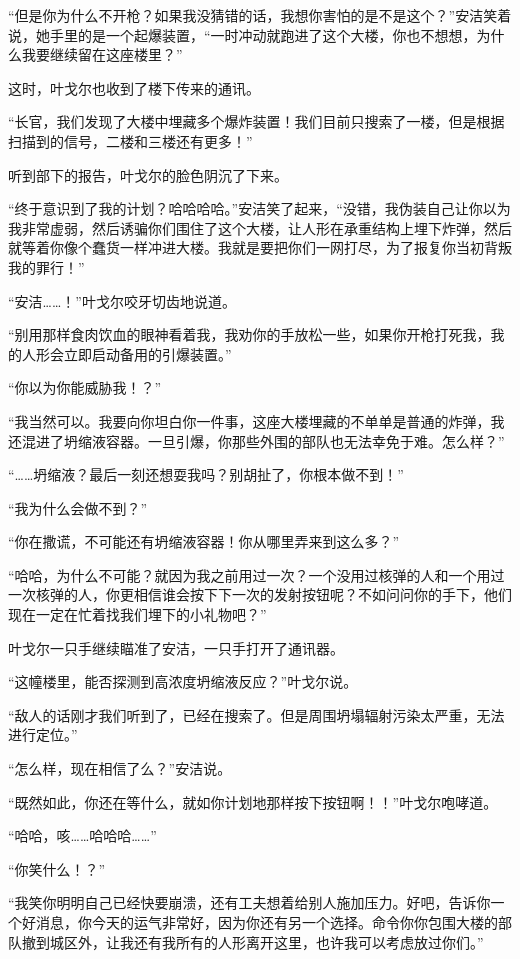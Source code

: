 “但是你为什么不开枪？如果我没猜错的话，我想你害怕的是不是这个？”安洁笑着说，她手里的是一个起爆装置，“一时冲动就跑进了这个大楼，你也不想想，为什么我要继续留在这座楼里？”

这时，叶戈尔也收到了楼下传来的通讯。

“长官，我们发现了大楼中埋藏多个爆炸装置！我们目前只搜索了一楼，但是根据扫描到的信号，二楼和三楼还有更多！”

听到部下的报告，叶戈尔的脸色阴沉了下来。

“终于意识到了我的计划？哈哈哈哈。”安洁笑了起来，“没错，我伪装自己让你以为我非常虚弱，然后诱骗你们围住了这个大楼，让人形在承重结构上埋下炸弹，然后就等着你像个蠢货一样冲进大楼。我就是要把你们一网打尽，为了报复你当初背叛我的罪行！”

“安洁……！”叶戈尔咬牙切齿地说道。

“别用那样食肉饮血的眼神看着我，我劝你的手放松一些，如果你开枪打死我，我的人形会立即启动备用的引爆装置。”

“你以为你能威胁我！？”

“我当然可以。我要向你坦白你一件事，这座大楼埋藏的不单单是普通的炸弹，我还混进了坍缩液容器。一旦引爆，你那些外围的部队也无法幸免于难。怎么样？”

“……坍缩液？最后一刻还想耍我吗？别胡扯了，你根本做不到！”

“我为什么会做不到？”

“你在撒谎，不可能还有坍缩液容器！你从哪里弄来到这么多？”

“哈哈，为什么不可能？就因为我之前用过一次？一个没用过核弹的人和一个用过一次核弹的人，你更相信谁会按下下一次的发射按钮呢？不如问问你的手下，他们现在一定在忙着找我们埋下的小礼物吧？”

叶戈尔一只手继续瞄准了安洁，一只手打开了通讯器。

“这幢楼里，能否探测到高浓度坍缩液反应？”叶戈尔说。

“敌人的话刚才我们听到了，已经在搜索了。但是周围坍塌辐射污染太严重，无法进行定位。”

“怎么样，现在相信了么？”安洁说。

“既然如此，你还在等什么，就如你计划地那样按下按钮啊！！”叶戈尔咆哮道。

“哈哈，咳……哈哈哈……”

“你笑什么！？”

“我笑你明明自己已经快要崩溃，还有工夫想着给别人施加压力。好吧，告诉你一个好消息，你今天的运气非常好，因为你还有另一个选择。命令你你包围大楼的部队撤到城区外，让我还有我所有的人形离开这里，也许我可以考虑放过你们。”

